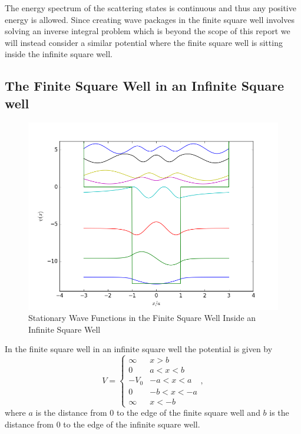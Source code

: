 \documentclass[12pt,a4paper]{article}
\begin{document}
The energy spectrum of the scattering states is continuous and thus any positive energy is allowed. Since creating wave packages in the finite square well involves solving an inverse integral problem which is beyond the scope of this report we will instead consider a similar potential where the finite square well is sitting inside the infinite square well.

\subsection{The Finite Square Well in an Infinite Square well}
\begin{figure}
\includegraphics[width=\textwidth]{../Python/WiW_stationarySolutions.png}
\caption{Stationary Wave Functions in the Finite Square Well Inside an Infinite Square Well}
\label{fig:wellInWell}
\end{figure}

In the finite square well in an infinite square well the potential is given by
\begin{equation}
V = \begin{cases} \infty & x > b \\
                  0 & a < x < b \\
                  - V_0 & -a < x < a \\
                  0 & -b < x < -a \\
                  \infty & x < -b
\end{cases},
\end{equation}
where $a$ is the distance from $0$ to the edge of the finite square well and $b$ is the distance from $0$ to the edge of the infinite square well.
\end{document}
